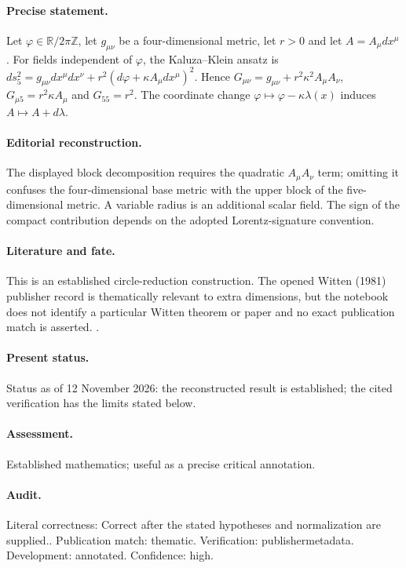 \paragraph{Precise statement.} Let $\varphi\in\mathbb R/2\pi\mathbb Z$, let $g_{\mu\nu}$ be a four-dimensional metric, let $r>0$ and let $A=A_\mu dx^\mu$. For fields independent of $\varphi$, the Kaluza--Klein ansatz is $ds_5^2=g_{\mu\nu}dx^\mu dx^\nu+r^2(d\varphi+\kappa A_\mu dx^\mu)^2$. Hence $G_{\mu\nu}=g_{\mu\nu}+r^2\kappa^2 A_\mu A_\nu$, $G_{\mu5}=r^2\kappa A_\mu$ and $G_{55}=r^2$. The coordinate change $\varphi\mapsto\varphi-\kappa\lambda(x)$ induces $A\mapsto A+d\lambda$.

\paragraph{Editorial reconstruction.} The displayed block decomposition requires the quadratic $A_\mu A_\nu$ term; omitting it confuses the four-dimensional base metric with the upper block of the five-dimensional metric. A variable radius is an additional scalar field. The sign of the compact contribution depends on the adopted Lorentz-signature convention.

\paragraph{Literature and fate.} This is an established circle-reduction construction. The opened Witten (1981) publisher record is thematically relevant to extra dimensions, but the notebook does not identify a particular Witten theorem or paper and no exact publication match is asserted. \citep{witten1981kaluza}.

\paragraph{Present status.} Status as of 12 November 2026: the reconstructed result is established; the cited verification has the limits stated below.

\paragraph{Assessment.} Established mathematics; useful as a precise critical annotation.

\paragraph{Audit.} Literal correctness: Correct after the stated hypotheses and normalization are supplied.. Publication match: thematic. Verification: publishermetadata. Development: annotated. Confidence: high.

